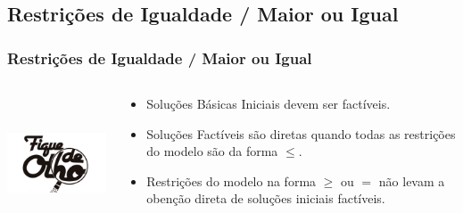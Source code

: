 \documentclass{beamer}
\begin{document}
\subsection{Restrições de Igualdade / Maior ou Igual }
\begin{frame}
	\frametitle{Restrições de Igualdade / Maior ou Igual}
	\begin{columns}
		\begin{column}{0.4\textwidth}
			\includegraphics[width=5cm,height=4cm]{fique-de-olho.jpg}
		\end{column}
		\begin{column}{0.5\textwidth}
			\begin{itemize}
			\item Soluções Básicas Iniciais devem ser factíveis.
			\item Soluções Factíveis são diretas quando todas as restrições do modelo são da forma $\le$.
			\item Restrições do modelo na forma $\ge$ ou $=$ não levam a obenção direta de soluções iniciais factíveis.
			\end{itemize}
		\end{column}
	\end{columns}
\end{frame}
\end{document}
